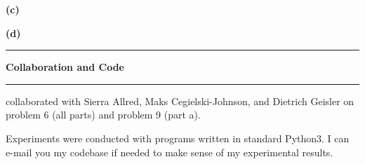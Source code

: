 \documentclass[11pt]{article}
\newcommand\question[2]{\vspace{.25in}\hrule\textbf{#1}\vspace{.5em}\hrule\vspace{.10in}}
\renewcommand\part[1]{\vspace{.10in}\textbf{(#1)}}
\begin{document}

\part{c}  


\part{d} 


\newpage

\question{Collaboration and Code}

I collaborated with Sierra Allred, Maks Cegielski-Johnson, and Dietrich Geisler on problem 6 (all parts) and problem 9 (part a). \newline


Experiments were conducted with programs written in standard Python3. I can e-mail you my codebase if needed to make sense of my experimental results.
\end{document}
